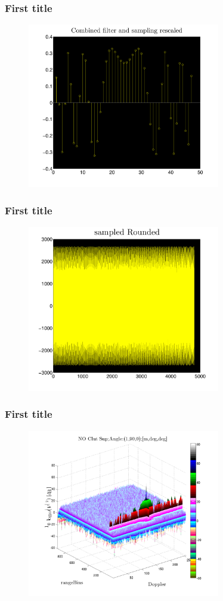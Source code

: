 \documentclass[11pt]{beamer} %
\begin{document}
\begin{frame}
 \frametitle{First title}
\begin{figure}
\includegraphics[width=0.75\textwidth]{Figures/SampledTxCombinedFilterSampRescale.pdf}
\end{figure}
\end{frame}



\begin{frame}
 \frametitle{First title}
\begin{figure}
\includegraphics[width=0.75\textwidth]{Figures/SampledTxLevels.pdf}
\end{figure}
\end{frame}




\begin{frame}
 \frametitle{First title}
\begin{figure}
\includegraphics[width=0.75\textwidth]{Figures/Doppler1Km100ms256Puls.pdf}
\end{figure}
\end{frame}
\end{document}
